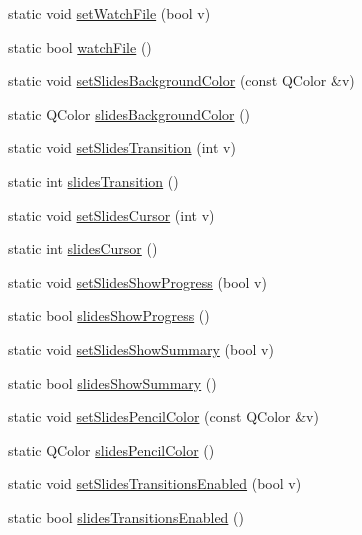 \begin{DoxyCompactItemize}
\item 
static void \hyperlink{classOkular_1_1Settings_a42ea94c57bcc7866267f3c00b1a0d48a}{set\+Watch\+File} (bool v)
\item 
static bool \hyperlink{classOkular_1_1Settings_adf3b5fa57f6f835a6155361cc11256d1}{watch\+File} ()
\item 
static void \hyperlink{classOkular_1_1Settings_a8fc596771dbc1e6953d0fc0fb465dfa6}{set\+Slides\+Background\+Color} (const Q\+Color \&v)
\item 
static Q\+Color \hyperlink{classOkular_1_1Settings_a8a692db67200b9e78363d736dbf4cd5f}{slides\+Background\+Color} ()
\item 
static void \hyperlink{classOkular_1_1Settings_a9e20325d493145ee8eaf00998aeb55c9}{set\+Slides\+Transition} (int v)
\item 
static int \hyperlink{classOkular_1_1Settings_adc0c690911c7f6354506c98adfa1a0b6}{slides\+Transition} ()
\item 
static void \hyperlink{classOkular_1_1Settings_af9d8ac3fc27c5d00601c0359f99e645d}{set\+Slides\+Cursor} (int v)
\item 
static int \hyperlink{classOkular_1_1Settings_a278364f63d8eb7e0bd3a6761d310993f}{slides\+Cursor} ()
\item 
static void \hyperlink{classOkular_1_1Settings_a2477d6a072f910be528d5a73d395666c}{set\+Slides\+Show\+Progress} (bool v)
\item 
static bool \hyperlink{classOkular_1_1Settings_ae6d1c06a5ae4bef003883132a9dc20bd}{slides\+Show\+Progress} ()
\item 
static void \hyperlink{classOkular_1_1Settings_ad3f2105a9318fc9d5b42896e8a6f73da}{set\+Slides\+Show\+Summary} (bool v)
\item 
static bool \hyperlink{classOkular_1_1Settings_ac06ca89e428ad1ee40753da80a1f35e5}{slides\+Show\+Summary} ()
\item 
static void \hyperlink{classOkular_1_1Settings_a559fac6cf597357b696c9b36f14489a4}{set\+Slides\+Pencil\+Color} (const Q\+Color \&v)
\item 
static Q\+Color \hyperlink{classOkular_1_1Settings_a9530068f98a10433890fe62034f0e11f}{slides\+Pencil\+Color} ()
\item 
static void \hyperlink{classOkular_1_1Settings_a27ace507bc8b1e598e38319dba329e8f}{set\+Slides\+Transitions\+Enabled} (bool v)
\item 
static bool \hyperlink{classOkular_1_1Settings_a263e866ac633422409f71d1ee6f8e7d5}{slides\+Transitions\+Enabled} ()
\item 

\end{DoxyCompactItemize}
